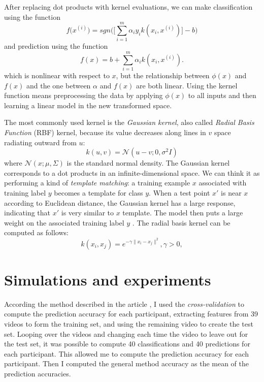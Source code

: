 \documentclass[10pt,journal,A4paper,compsoc,epsfig]{IEEEtran}
\begin{document}
After replacing dot products with kernel evaluations, we can make classification using the function
\begin{equation}
f\big(x^{(i)}\big) = sgn\Bigg(\Bigg[\sum_{i=1}^m{\alpha_iy_ik(x_i, x^{(i)})\Bigg] - b}\Bigg)
\end{equation}
and prediction using the function
\begin{equation}
f(x) = b + \sum_{i=1}^m {\alpha_ik(x_i, x^{(i)})}.
\end{equation}
which is nonlinear with respect to $x$, but the relationship between $\phi(x)$ and $f(x)$ and the one between $\alpha$ and $f(x)$ are both linear. 
Using the kernel function means preprocessing the data by applying $\phi(x)$ to all inputs and then learning a linear model in the new transformed space.

The most commonly used kernel is the \textit{Gaussian kernel}, also called \textit{Radial Basis Function} (RBF) kernel, because its value decreases along lines in $v$ space radiating outward from $u$:
\begin{equation}
k(u, v) = \mathcal{N}(u-v; 0, \sigma^2I)
\end{equation}
where $\mathcal{N}(x; \mu, \Sigma)$ is the standard normal density.
The Gaussian kernel corresponds to a dot products in an infinite-dimensional space. We can think it as performing a kind of \textit{template matching}: a training example $x$ associated with training label $y$ becomes a template for class $y$. When a test point $x'$ is near $x$ according to Euclidean distance, the Gaussian kernel has a large response, indicating that $x'$ is very similar to $x$ template. The model then puts a large weight on the associated training label $y$ \cite{lecun2015deep}.
The radial basis kernel can be computed as follows:
\begin{equation}
k(x_i, x_j) = e^{-\gamma \|x_i - x_j\|^2}, \gamma > 0,
\end{equation}



\section{Simulations and experiments}
\label{simul}

According the method described in the article \cite{zhuang2017emotion}, I used the \textit{cross-validation} to compute the prediction accuracy for each participant, extracting features from 39 videos to form the training set, and using the remaining video to create the test set. Looping over the videos and changing each time the video to leave out for the test set, it was possible to compute 40 classifications and 40 predictions for each participant. This allowed me to compute the prediction accuracy for each participant. Then I computed the general method accuracy as the mean of the prediction accuracies.
\end{document}
